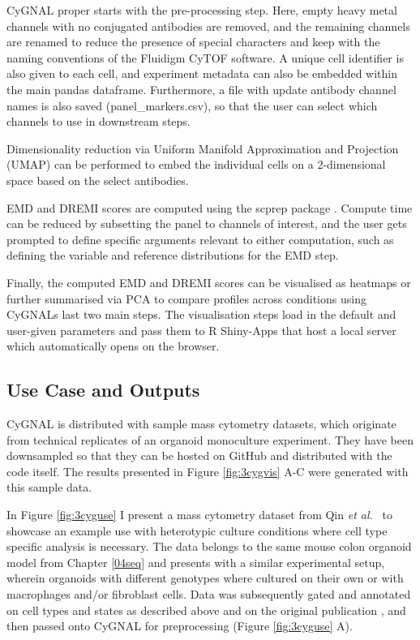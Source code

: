 CyGNAL proper starts with the pre-processing step. Here, empty heavy metal channels with no conjugated antibodies are removed, and the remaining channels are renamed to reduce the presence of special characters and keep with the naming conventions of the Fluidigm CyTOF software. A unique cell identifier is also given to each cell, and experiment metadata can also be embedded within the main pandas dataframe. Furthermore, a file with update antibody channel names is also saved (panel\_markers.csv), so that the user can select which channels to use in downstream steps.

Dimensionality reduction via Uniform Manifold Approximation and Projection (UMAP)\cite{mcinnes_umap_2020} can be performed to embed the individual cells on a 2-dimensional space based on the select antibodies.

EMD and DREMI scores are computed using the scprep package \cite{noauthor_krishnaswamylabscprep_2021}. Compute time can be reduced by subsetting the panel to channels of interest, and the user gets prompted to define specific arguments relevant to either computation, such as defining the variable and reference distributions for the EMD step.

Finally, the computed EMD and DREMI scores can be visualised as heatmaps or further summarised via PCA to compare profiles across conditions using CyGNALs last two main steps. The visualisation steps load in the default and user-given parameters and pass them to R Shiny-Apps \cite{noauthor_rstudioshiny_2021} that host a local server which automatically opens on the browser.

\subsection{Use Case and Outputs}

CyGNAL is distributed with sample mass cytometry datasets, which originate from technical replicates of an organoid monoculture experiment. They have been downsampled so that they can be hosted on GitHub and distributed with the code itself. The results presented in Figure \ref{fig:3cygvis} A-C were generated with this sample data.

In Figure \ref{fig:3cyguse} I present a mass cytometry dataset from Qin \emph{et al.}~\cite{qin_cell-type-specific_2020} to showcase an example use with heterotypic culture conditions where cell type specific analysis is necessary. The data belongs to the same mouse colon organoid model from Chapter \ref{04seq} and presents with a similar experimental setup, wherein organoids with different genotypes where cultured on their own or with macrophages and/or fibroblast cells. Data was subsequently gated and annotated on cell types and states as described above and on the original publication \cite{qin_cell-type-specific_2020}, and then passed onto CyGNAL for preprocessing (Figure \ref{fig:3cyguse} A).

